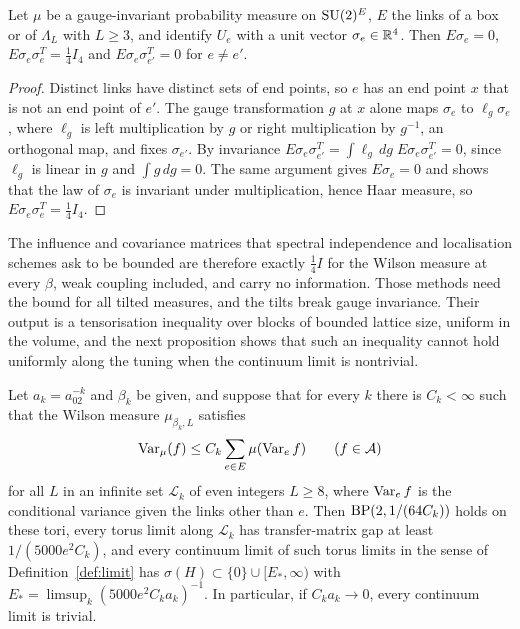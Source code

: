 \begin{proposition}\label{prop:linkcov}
Let $\mu$ be a gauge-invariant probability measure on $\mathrm{SU}(2)^E$, $E$ the links
of a box or of $\Lambda_L$ with $L\ge3$, and identify $U_e$ with a unit vector
$\sigma_e\in\mathbb{R}^4$. Then $E\sigma_e=0$, $E\sigma_e\sigma_e^T=\frac14I_4$ and
$E\sigma_e\sigma_{e'}^T=0$ for $e\ne e'$.
\end{proposition}

\begin{proof}
Distinct links have distinct sets of end points, so $e$ has an end point $x$
that is not an end point of $e'$. The gauge transformation $g$ at $x$ alone
maps $\sigma_e$ to $\ell_g\sigma_e$, where $\ell_g$ is left multiplication by
$g$ or right multiplication by $g^{-1}$, an orthogonal map, and fixes
$\sigma_{e'}$. By invariance $E\sigma_e\sigma_{e'}^T=\int\ell_g\,dg\;E\sigma_e
\sigma_{e'}^T=0$, since $\ell_g$ is linear in $g$ and $\int g\,dg=0$. The same
argument gives $E\sigma_e=0$ and shows that the law of $\sigma_e$ is invariant
under multiplication, hence Haar measure, so $E\sigma_e\sigma_e^T=\frac14I_4$.
\end{proof}

The influence and covariance matrices that spectral independence and
localisation schemes ask to be bounded are therefore exactly $\frac14I$ for the
Wilson measure at every $\beta$, weak coupling included, and carry no
information. Those methods need the bound for all tilted measures, and the
tilts break gauge invariance. Their output is a tensorisation inequality over
blocks of bounded lattice size, uniform in the volume, and the next
proposition shows that such an inequality cannot hold uniformly along the
tuning when the continuum limit is nontrivial.

\begin{proposition}\label{prop:fixedblocks}
Let $a_k=a_02^{-k}$ and $\beta_k$ be given, and suppose that for every $k$
there is $C_k<\infty$ such that the Wilson measure $\mu_{\beta_k,L}$ satisfies
\[
\operatorname{Var}_\mu(f)\le C_k\sum_{e\in E}\mu(\operatorname{Var}_ef)\qquad(f\in\mathcal A)
\]
for all $L$ in an infinite set $\mathcal L_k$ of even integers $L\ge8$, where
$\operatorname{Var}_ef$ is the conditional variance given the links other than $e$. Then
$\mathrm{BP}(2,1/(64C_k))$ holds on these tori, every torus limit along $\mathcal L_k$
has transfer-matrix gap at least $1/(5000e^2C_k)$, and every continuum limit
of such torus limits in the sense of Definition~\ref{def:limit} has
$\sigma(H)\subset\{0\}\cup[E_*,\infty)$ with $E_*=\limsup_k(5000e^2C_ka_k)^{-1}$.
In particular, if $C_ka_k\to0$, every continuum limit is trivial.
\end{proposition}

